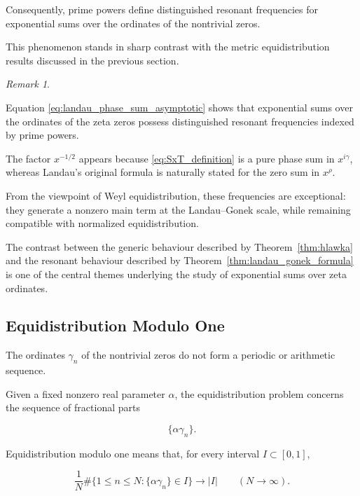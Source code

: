 \documentclass[11pt]{amsart}
\numberwithin{equation}{section}
\theoremstyle{plain}
\theoremstyle{definition}
\theoremstyle{remark}
\newtheorem{remark}[theorem]{Remark}
\begin{document}
Consequently,
prime powers define distinguished resonant frequencies for exponential
sums over the ordinates of the nontrivial zeros.

This phenomenon stands in sharp contrast with the metric
equidistribution results discussed in the previous section.

\begin{remark}
\label{rem:prime_power_resonances}

Equation
\eqref{eq:landau_phase_sum_asymptotic}
\cite{Landau1911,Gonek1984}
shows that exponential sums over the ordinates of the zeta zeros possess
distinguished resonant frequencies indexed by prime powers.

The factor \(x^{-1/2}\) appears because
\eqref{eq:SxT_definition} is a pure phase sum in \(x^{i\gamma}\),
whereas Landau's original formula is naturally stated for the zero sum
in \(x^\rho\).

From the viewpoint of Weyl equidistribution,
these frequencies are exceptional:
they generate a nonzero main term at the Landau--Gonek scale,
while remaining compatible with normalized equidistribution.

The contrast between the generic behaviour described by
Theorem~\ref{thm:hlawka}
and the resonant behaviour described by
Theorem~\ref{thm:landau_gonek_formula}
is one of the central themes underlying the study of exponential sums
over zeta ordinates.

\end{remark}


\subsection{Equidistribution Modulo One}
\label{sec:equidistribution_modulo_one}

The ordinates \(\gamma_n\) of the nontrivial zeros do not form a
periodic or arithmetic sequence.

Given a fixed nonzero real parameter \(\alpha\), the equidistribution
problem concerns the sequence of fractional parts

\begin{equation}
\{\alpha\gamma_n\}.
\label{eq:scaled_ordinate_fractional_parts}
\end{equation}

Equidistribution modulo one means that, for every interval
\(I\subset[0,1]\),

\begin{equation}
\frac{1}{N}
\#\{1\le n\le N:\{\alpha\gamma_n\}\in I\}
\longrightarrow
|I|
\qquad
(N\to\infty).
\label{eq:equidistribution_interval_definition}
\end{equation}
\end{document}
